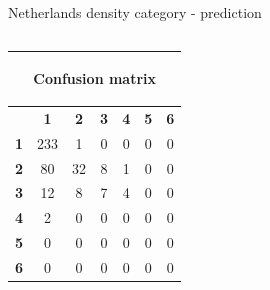 \documentclass[c]{beamer}
\begin{document}
\begin{frame}
\begin{columns}
\begin{column}{0.5\textwidth}
\begin{overlayarea}{\linewidth}{4cm}
  \end{overlayarea}
  \begin{overlayarea}{\linewidth}{0.5cm}
    \centering
    \tiny Netherlands density category - prediction\par
  \end{overlayarea}
 \end{column}
\end{columns}
\begin{columns}
 \begin{column}{0.6\textwidth}
 \begin{overlayarea}{\linewidth}{2cm}
  \begin{table}
  \begin{center}
  \begin{adjustbox}{max width=0.6\textwidth}
  {\tiny
  \begin{tabular}{|c|c|c|c|c|c|c|}
    \hline
    \multicolumn{7}{|c|}{{\tiny \begin{bf}Confusion matrix\end{bf}}} \\
    \hline
     & \textbf{1} & \textbf{2} & \textbf{3} & \textbf{4} & \textbf{5} & \textbf{6}\\
    \hline
    \textbf{1} & 233 & 1 & 0 & 0 & 0 & 0\\
    \hline
    \textbf{2} & 80 & 32 & 8 & 1 & 0 & 0\\
    \hline
    \textbf{3} & 12 & 8 & 7 & 4 & 0 & 0\\
    \hline
    \textbf{4} & 2 & 0 & 0 & 0 & 0 & 0\\
    \hline
    \textbf{5} & 0 & 0 & 0 & 0 & 0 & 0\\
    \hline
    \textbf{6} & 0 & 0 & 0 & 0 & 0 & 0\\
    \hline
  \end{tabular}
  }
  \end{adjustbox}
  \end{center}
  \end{table}
 \end{overlayarea}
 \end{column}
 \begin{column}{0.6\textwidth}

\end{column}
\end{columns}
\end{frame}
\end{document}
